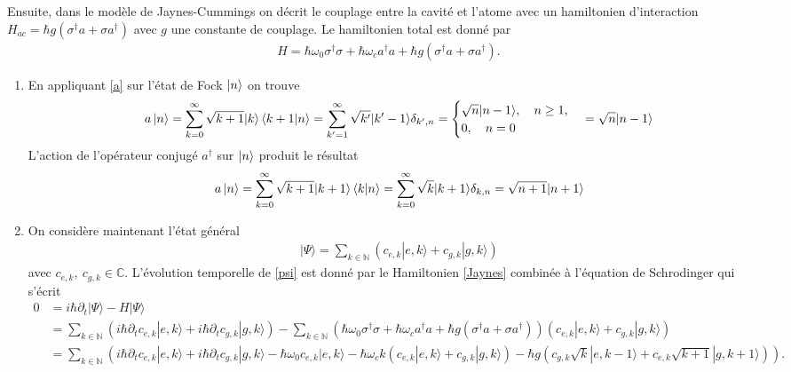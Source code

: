 {Ensuite, dans le modèle de Jaynes-Cummings on décrit le couplage entre la cavité et l'atome avec un hamiltonien d'interaction $H_{ac} = \hbar g (\sigma^\dagger a + \sigma a^\dagger)$ avec $g$ une constante de couplage. Le hamiltonien total est donné par 
\begin{align}
    H = \hbar \omega_0\sigma^\dagger \sigma + \hbar \omega_c a^\dagger a + \hbar g (\sigma^\dagger a + \sigma a^\dagger). \label{Jaynes}
\end{align}
\begin{enumerate}
    \item En appliquant \eqref{a} sur l'état de Fock $\ket{n}$ on trouve
    \begin{align}
      a \ket{n} = \sum_{k=0}^{\infty} \sqrt{k+1}|k\rangle\bra{k+1}\ket{n} = \sum_{k'=1}^{\infty} \sqrt{k'}|k'-1\rangle \delta_{k', n} = \begin{cases}
         \sqrt{n}|n-1\rangle, \quad n\ge 1,\\ 
         0, \quad n = 0
      \end{cases} 
      = \sqrt{n}|n-1\rangle \label{aa}
    \end{align}
    L'action de l'opérateur conjugé $a^\dagger$ sur $\ket{n}$ produit le résultat 
    \begin{align}
        a \ket{n} = \sum_{k=0}^{\infty} \sqrt{k+1}|k+1\rangle\bra{k}\ket{n} = \sum_{k=0}^{\infty} \sqrt{k}|k+1\rangle \delta_{k, n} =
           \sqrt{n+1}|n+1\rangle \label{aad}
    \end{align}
    \item On considère maintenant l'état général
    \begin{align}
        |\Psi\rangle=\sum_{k\in \mathbb{N}} (c_{e, k}|e, k\rangle+c_{g, k}|g, k\rangle) \label{psi}
    \end{align}
    avec $c_{e, k}, \ c_{g, k} \in \mathbb{C}$. L'évolution temporelle de \eqref{psi} est donné par le Hamiltonien \eqref{Jaynes} combinée à l'équation de Schrodinger qui s'écrit 
    \begin{align}
       0 &=  i \hbar \partial_t |\Psi\rangle - H |\Psi\rangle \nonumber\\
       &= \sum_{k\in \mathbb{N}} (i\hbar\partial_t{c}_{e, k}|e, k\rangle+i\hbar\partial_t{c}_{g, k}|g, k\rangle) - \sum_{k\in \mathbb{N}} \left(\hbar \omega_0\sigma^\dagger \sigma + \hbar \omega_c a^\dagger a + \hbar g  (\sigma^\dagger a + \sigma a^\dagger) \right)(c_{e, k}|e, k\rangle+c_{g, k}|g, k\rangle) \nonumber\\
       &=  \sum_{k\in \mathbb{N}} \left(i\hbar\partial_t{c}_{e, k}|e, k\rangle+i\hbar\partial_t{c}_{g, k}|g, k\rangle - \hbar \omega_0 c_{e, k}|e, k\rangle - \hbar \omega_c k (c_{e, k}|e, k\rangle+c_{g, k}|g, k\rangle)  - \hbar g  (c_{g, k}\sqrt{k}|e, k-1\rangle +  c_{e, k}\sqrt{k+1}|g, k+1\rangle) \right).\label{psi2}

\end{align}
\end{enumerate}}
